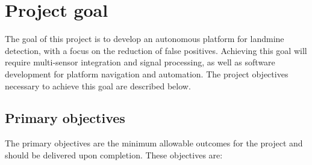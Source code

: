 \documentclass[main.tex]{subfiles}
\begin{document}
\section{Project goal}

The goal of this project is to develop an autonomous platform for landmine detection, with a focus on the reduction of false positives. Achieving this goal will require multi-sensor integration and signal processing, as well as software development for platform navigation and automation. The project objectives necessary to achieve this goal are described below.
 
\subsection{Primary objectives}
The primary objectives are the minimum allowable outcomes for the project and should be delivered upon completion. These objectives are:
\end{document}
